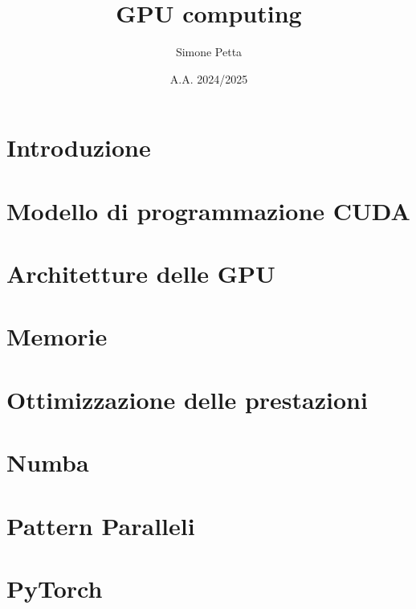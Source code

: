\documentclass[a4paper,12pt]{report}
\title{GPU computing}
\author{Simone Petta}
\date{A.A. 2024/2025}
\begin{document}
\maketitle
\tableofcontents

\chapter{Introduzione}


\chapter{Modello di programmazione CUDA}


\chapter{Architetture delle GPU}


\chapter{Memorie}


\chapter{Ottimizzazione delle prestazioni}


\chapter{Numba}


\chapter{Pattern Paralleli}


\chapter{PyTorch}

\end{document}
